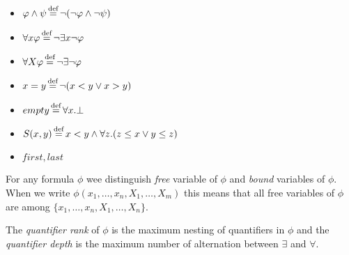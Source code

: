 \begin{definition}[Abbreviations]~
	\begin{itemize}
		\item $\varphi \land \psi \operatorname{\stackrel{\text{def}}{=}} \neg (\neg \varphi \land \neg \psi)$ 
		\item $\forall x \varphi \operatorname{\stackrel{\text{def}}{=}} \neg \exists x \neg \varphi$ 
		\item $\forall X\varphi \operatorname{\stackrel{\text{def}}{=}} \neg \exists \neg \varphi$ 
		\item $x = y \operatorname{\stackrel{\text{def}}{=}} \neg(x <y \lor x >y)$ 
		\item $empty \operatorname{\stackrel{\text{def}}{=}} \forall x. \bot$ 
		\item $S(x, y) \operatorname{\stackrel{\text{def}}{=}} x < y \land \forall z.(z \leq x \lor y \leq z)$
		\item $first, last$
	\end{itemize}
\end{definition}

For any formula $\phi$ wee distinguish \emph{free} variable of  $\phi$ 
and \emph{bound} variables of $\phi$.\\
When we write $\phi(x_{1}, \ldots, x_{n}, X_{1}, \ldots, X_{m})$ this means
that all free variables of $\phi$ are among $\{x_{1}, \ldots, x_{n}, X_{1},
\ldots, X_{n}\}$.
\begin{definition}
	The \emph{quantifier rank} of $\phi$ is the maximum nesting of quantifiers
	in $\phi$ and the \emph{quantifier depth} is the maximum number
	of alternation between $\exists$ and $\forall$.
\end{definition}

